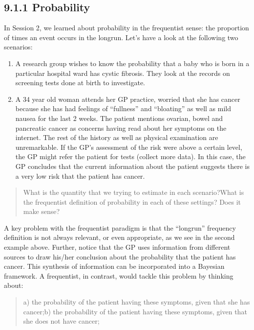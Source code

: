 \documentclass[letterpaper,10pt,english]{jupyterBook}
\begin{document}
\subsection{9.1.1 Probability}
\label{\detokenize{09.b. Bayesian Statistics I:probability}}
\sphinxAtStartPar
In Session 2, we learned about probability in the frequentist sense: the proportion of times an event occurs in the long\sphinxhyphen{}run. Let’s have a look at the following two scenarios:
\begin{enumerate}
%
\item {} 
\sphinxAtStartPar
A research group wishes to know the probability that a baby who is born in a particular hospital ward has cystic fibrosis. They look at the records on screening tests done at birth to investigate.

\item {} 
\sphinxAtStartPar
A 34 year old woman attends her GP practice, worried that she has cancer because she has had feelings of “fullness” and “bloating” as well as mild nausea for the last 2 weeks. The patient mentions ovarian, bowel and pancreatic cancer as concerns having read about her symptoms on the internet. The rest of the history as well as physical examination are unremarkable. If the GP’s assessment of the risk were above a certain level, the GP might refer the patient for tests (collect more data). In this case, the GP concludes that the current information about the patient suggests there is a very low risk that the patient has cancer.

\end{enumerate}
\begin{quote}

\sphinxAtStartPar
What is the quantity that we trying to estimate in each scenario?What is the frequentist definition of probability in each of these settings? Does it make sense?
\end{quote}

\sphinxAtStartPar
A key problem with the frequentist paradigm is that the “long\sphinxhyphen{}run” frequency definition is not always relevant, or even appropriate, as we see in the second example above. Further, notice that the GP uses information from different sources to draw his/her conclusion about the probability that the patient has cancer. This synthesis of information can be incorporated into a Bayesian framework. A frequentist, in contrast, would tackle this problem by thinking about:
\begin{quote}

\sphinxAtStartPar
a) the probability of the patient having these symptoms, given that she has cancer;b) the probability of the patient having these symptoms, given that she does not have cancer;
\end{quote}
\end{document}
